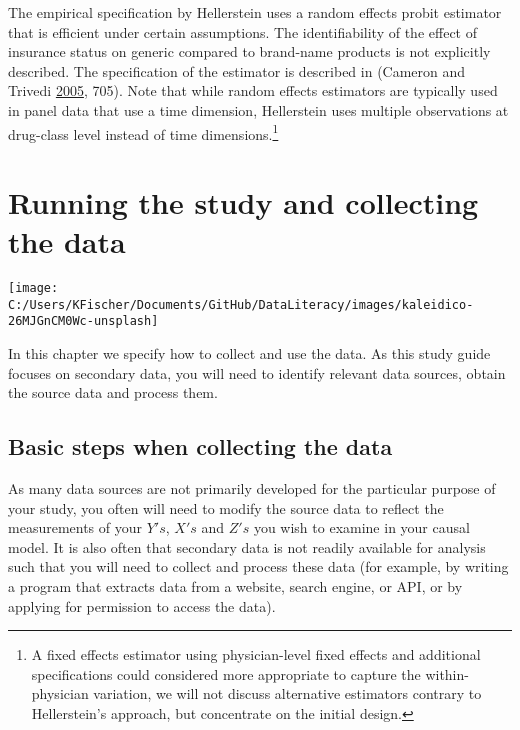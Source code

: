 \documentclass[
]{book}
\begin{document}
The empirical specification by Hellerstein uses a random effects probit
estimator that is efficient under certain assumptions. The
identifiability of the effect of insurance status on generic compared to
brand-name products is not explicitly described. The specification of
the estimator is described in (Cameron and Trivedi
\protect\hyperlink{ref-cameron_microeconometrics_2005}{2005}, 705). Note
that while random effects estimators are typically used in panel data
that use a time dimension, Hellerstein uses multiple observations at
drug-class level instead of time dimensions.\footnote{A fixed effects
  estimator using physician-level fixed effects and additional
  specifications could considered more appropriate to capture the
  within-physician variation, we will not discuss alternative estimators
  contrary to Hellerstein's approach, but concentrate on the initial
  design.}

\hypertarget{run-study}{%
\chapter{Running the study and collecting the data}\label{run-study}}

\begin{center}\texttt{[image: C:/Users/KFischer/Documents/GitHub/DataLiteracy/images/kaleidico-26MJGnCM0Wc-unsplash]} \end{center}

In this chapter we specify how to collect and use the data. As this
study guide focuses on secondary data, you will need to identify
relevant data sources, obtain the source data and process them.

\hypertarget{basic-steps-when-collecting-the-data}{%
\section{Basic steps when collecting the
data}\label{basic-steps-when-collecting-the-data}}

As many data sources are not primarily developed for the particular
purpose of your study, you often will need to modify the source data to
reflect the measurements of your \(Y's\), \(X's\) and \(Z's\) you wish
to examine in your causal model. It is also often that secondary data is
not readily available for analysis such that you will need to collect
and process these data (for example, by writing a program that extracts
data from a website, search engine, or API, or by applying for
permission to access the data).
\end{document}
